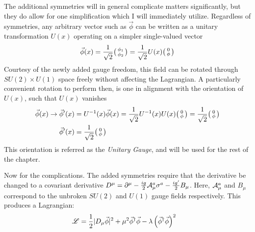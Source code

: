     The additional symmetries will in general complicate matters significantly,
        but they do allow for one simplification which I will immediately utilize.
    Regardless of symmetries, any arbitrary vector such as $\vec{\phi}$ can be written as a unitary transformation $U(x)$ operating on a simpler single-valued vector
    \begin{equation}
        \vec{\phi}(x) = \frac{1}{\sqrt{2}} \big(\begin{smallmatrix} \phi_1 \\ \phi_2 \end{smallmatrix}\big) = \frac{1}{\sqrt{2}} U(x) \big(\begin{smallmatrix} 0 \\ \phi \end{smallmatrix}\big)
    \end{equation}
    Courtesy of the newly added gauge freedom, this field can be rotated through $SU(2) \times U(1)$ space freely without affecting the Lagrangian.
    A particularly convenient rotation to perform then, is one in alignment with the orientation of $U(x)$, such that $U(x)$ vanishes
    \begin{equation} \begin{split}
        \vec{\phi}(x) \rightarrow \vec{\phi}'(x) 
            &= U^{-1}(x) \vec{\phi}(x)
            = \frac{1}{\sqrt{2}} U^{-1}(x) U(x) \big(\begin{smallmatrix} 0 \\ \phi \end{smallmatrix}\big)
            = \frac{1}{\sqrt{2}} \big(\begin{smallmatrix} 0 \\ \phi \end{smallmatrix}\big) \\
        \vec{\phi}'(x) &= \frac{1}{\sqrt{2}} \big(\begin{smallmatrix} 0 \\ \phi \end{smallmatrix}\big)
    \end{split} \end{equation}
    This orientation is referred as the \textit{Unitary Gauge}, and will be used for the rest of the chapter.

    Now for the complications.
    The added symmetries require that the derivative be changed to a covariant derivative 
        $D^{\mu} = \partial^{\mu} - \frac{ig}{2} \mathcal{A}^a_{\mu} \sigma^a - \frac{ig'}{2} B_{\mu}$.
    Here, $\mathcal{A}^a_\mu$ and $B_\mu$ correspond to the unbroken $SU(2)$ and $U(1)$ gauge fields respectively.
    This produces a Lagrangian:
    \begin{equation} \begin{split}
        \mathscr{L} &= \frac{1}{2} |D_{\mu} \vec{\phi}|^2 +
            \mu^2 \vec{\phi}^\dag \vec{\phi} - \lambda \left( \vec{\phi}^\dag\vec{\phi} \right)^2
    \end{split} \end{equation}


